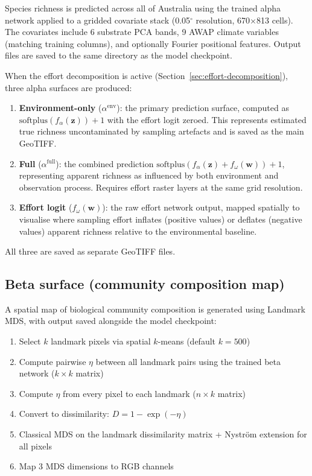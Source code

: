\documentclass{article}
\begin{document}
Species richness is predicted across all of Australia using the trained alpha network applied to a gridded covariate stack (0.05$^\circ$ resolution, 670$\times$813 cells). The covariates include 6 substrate PCA bands, 9 AWAP climate variables (matching training columns), and optionally Fourier positional features. Output files are saved to the same directory as the model checkpoint.

When the effort decomposition is active (Section~\ref{sec:effort-decomposition}), three alpha surfaces are produced:
\begin{enumerate}
    \item \textbf{Environment-only} ($\alpha^{\text{env}}$): the primary prediction surface, computed as $\text{softplus}(f_\alpha(\mathbf{z})) + 1$ with the effort logit zeroed. This represents estimated true richness uncontaminated by sampling artefacts and is saved as the main GeoTIFF.
    \item \textbf{Full} ($\alpha^{\text{full}}$): the combined prediction $\text{softplus}(f_\alpha(\mathbf{z}) + f_\omega(\mathbf{w})) + 1$, representing apparent richness as influenced by both environment and observation process. Requires effort raster layers at the same grid resolution.
    \item \textbf{Effort logit} ($f_\omega(\mathbf{w})$): the raw effort network output, mapped spatially to visualise where sampling effort inflates (positive values) or deflates (negative values) apparent richness relative to the environmental baseline.
\end{enumerate}
All three are saved as separate GeoTIFF files.

\subsection{Beta surface (community composition map)}

A spatial map of biological community composition is generated using Landmark MDS, with output saved alongside the model checkpoint:
\begin{enumerate}
    \item Select $k$ landmark pixels via spatial $k$-means (default $k = 500$)
    \item Compute pairwise $\eta$ between all landmark pairs using the trained beta network ($k \times k$ matrix)
    \item Compute $\eta$ from every pixel to each landmark ($n \times k$ matrix)
    \item Convert to dissimilarity: $D = 1 - \exp(-\eta)$
    \item Classical MDS on the landmark dissimilarity matrix + Nystr\"om extension for all pixels
    \item Map 3 MDS dimensions to RGB channels
\end{enumerate}
\end{document}
